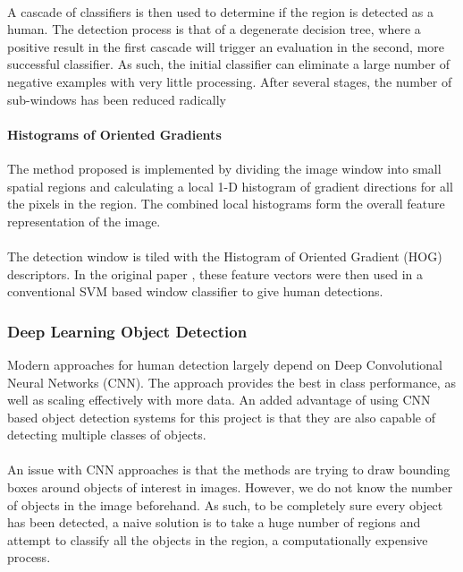 \paragraph{}A cascade of classifiers is then used to determine if the region is detected as a human. The detection process is that of a degenerate decision tree, where a positive result in the first cascade will trigger an evaluation in the second, more successful classifier. As such, the initial classifier can eliminate a large number of negative examples with very little processing. After several stages, the number of sub-windows has been reduced radically

\paragraph{Histograms of Oriented Gradients}
The method proposed is implemented by dividing the image window into small spatial regions and calculating a local 1-D histogram of gradient directions for all the pixels in the region. The combined local histograms form the overall feature representation of the image.

\paragraph{}The detection window is tiled with the Histogram of Oriented Gradient (HOG) descriptors. In the original paper \cite{Dalal2005}, these feature vectors were then used in a conventional SVM based window classifier  to give human detections.

\subsubsection{Deep Learning Object Detection}
Modern approaches for human detection largely depend on Deep Convolutional Neural Networks (CNN). The approach provides the best in class performance, as well as scaling effectively with more data. An added advantage of using CNN based object detection systems for this project is that they are also capable of detecting multiple classes of objects.

\paragraph{}An issue with CNN approaches is that the methods are trying to draw bounding boxes around objects of interest in images. However, we do not know the number of objects in the image beforehand. As such, to be completely sure every object has been detected, a naive solution is to take a huge number of regions and attempt to classify all the objects in the region, a computationally expensive process.

